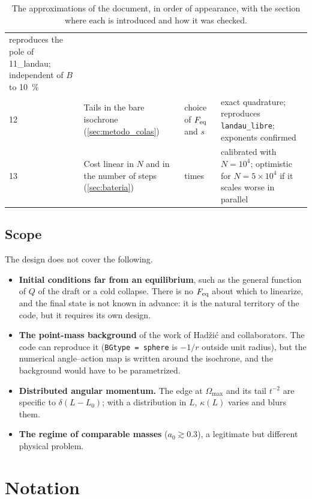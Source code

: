 \documentclass[11pt,a4paper]{article}
\begin{document}
\begin{table}[!htbp]
\begin{tabular}{p{0.6cm}p{4.3cm}p{3.1cm}p{5.6cm}}
  reproduces the pole of 11\_landau; independent of $B$ to \SI{10}{\%}\\
12 & Tails in the bare isochrone (\ref{sec:metodo_colas}) & choice of $F_{\rm eq}$ and $s$ &
  exact quadrature; reproduces \texttt{landau\_\allowbreak libre}; exponents confirmed\\
13 & Cost linear in $N$ and in the number of steps (\ref{sec:bateria}) & times &
  calibrated with $N=10^4$; optimistic for $N=5\times10^4$ if it scales worse in parallel\\
\bottomrule
\end{tabular}
\caption{The approximations of the document, in order of appearance, with the section
where each is introduced and how it was checked.}
\label{tab:aprox}
\end{table}

\subsection{Scope}
\label{sec:nocubre}

The design does not cover the following.
\begin{itemize}
\item \textbf{Initial conditions far from an equilibrium}, such as the general function of
$Q$ of the draft or a cold collapse. There is no $F_{\rm eq}$ about which to linearize, and the
final state is not known in advance: it is the natural territory of the code, but it
requires its own design.
\item \textbf{The point-mass background} of the work of Hadžić and collaborators. The code can
reproduce it (\texttt{BGtype = sphere} is $-1/r$ outside unit radius), but the numerical
angle--action map is written around the isochrone, and the background would have to be
parametrized.
\item \textbf{Distributed angular momentum.} The edge at $\Omega_{\max}$ and its tail $t^{-2}$ are
specific to $\delta(L-L_0)$; with a distribution in $L$, $\kappa(L)$ varies and blurs them.
\item \textbf{The regime of comparable masses} ($a_0\gtrsim0.3$), a legitimate but different
physical problem.
\end{itemize}

\appendix

\section{Notation}
\label{sec:notacion}
\end{document}

